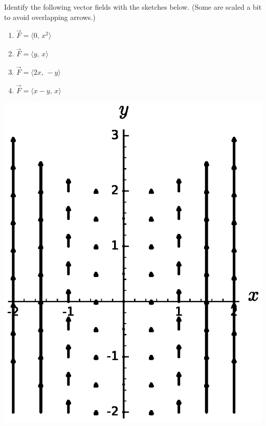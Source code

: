 \begin{ex}
    Identify the following vector fields with the sketches below. (Some are scaled a bit to avoid overlapping arrows.)
    \begin{multicols}{4}
    \begin{enumerate}
        \item $\vec{F}=\langle 0,\, x^2\rangle$
        \item $\vec{F}=\langle y,\, x\rangle$
        \item $\vec{F}=\langle 2x,\, -y\rangle$
        \item $\vec{F}=\langle x-y,\, x\rangle$
    \end{enumerate}
    \end{multicols}
    
    \begin{minipage}{.4\textwidth}
        \includegraphics[width=\textwidth]{images/mult1} \label{img:sage-vector-field-2}
    \end{minipage}
    \hfill
    \begin{minipage}{.4\textwidth}

\end{minipage}
\end{ex}
